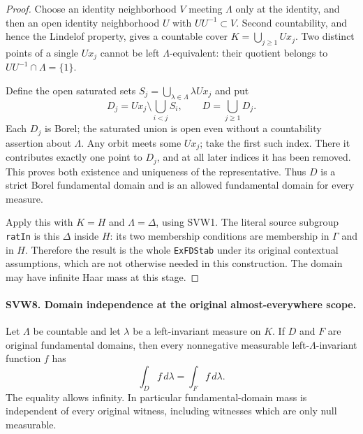 \documentclass[11pt,a4paper]{article}
\numberwithin{equation}{section}
\theoremstyle{remark}\newtheorem{remark}[theorem]{Remark}
\begin{document}
\begin{proof}
Choose an identity neighborhood $V$ meeting $\Lambda$ only at the
identity, and then an open identity neighborhood $U$ with
$UU^{-1}\subset V$.  Second countability, and hence the Lindelof
property, gives a countable cover $K=\bigcup_{j\geq1}Ux_j$.
Two distinct points of a single $Ux_j$ cannot be left
$\Lambda$-equivalent: their quotient belongs to $UU^{-1}\cap
\Lambda=\{1\}$.

Define the open saturated sets
$S_j=\bigcup_{\lambda\in\Lambda}\lambda Ux_j$ and put
\[
 D_j=Ux_j\setminus\bigcup_{i<j}S_i,
                    \qquad D=\bigcup_{j\geq1}D_j.
 \tag{SVW.14}
\]
Each $D_j$ is Borel; the saturated union is open even without a
countability assertion about $\Lambda$.  Any orbit meets some
$Ux_j$; take the first such index.  There it contributes exactly
one point to $D_j$, and at all later indices it has been removed.
This proves both existence and uniqueness of the representative.
Thus $D$ is a strict Borel fundamental domain and is an allowed
fundamental domain for every measure.

Apply this with $K=H$ and $\Lambda=\Delta$, using SVW1.
The literal source subgroup \texttt{rat\allowbreak In} is this $\Delta$ inside
$H$: its two membership conditions are membership in $\Gamma$
and in $H$.  Therefore the result is the whole \texttt{Ex\allowbreak FDStab}
under its original contextual assumptions, which are not otherwise
needed in this construction.  The domain may have infinite Haar
mass at this stage.
\end{proof}

\paragraph{SVW8. Domain independence at the original almost-everywhere scope.}
\label{claim:SVW8}
Let $\Lambda$ be countable and let $\lambda$ be a left-invariant
measure on $K$.  If $D$ and $F$ are original fundamental domains,
then every nonnegative measurable left-$\Lambda$-invariant function
$f$ has
\[
                     \int_D f\,d\lambda=\int_F f\,d\lambda.
 \tag{SVW.15}
\]
The equality allows infinity.  In particular fundamental-domain
mass is independent of every original witness, including witnesses
which are only null measurable.
\end{document}
